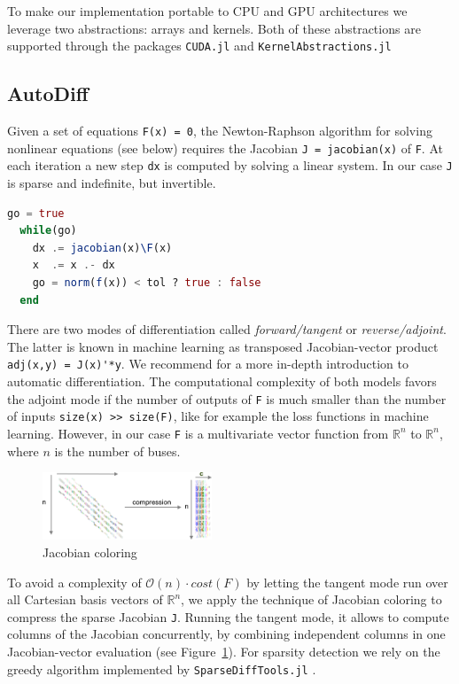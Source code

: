 \documentclass{juliacon}
\newcommand{\reffig}[1]{Figure~\ref{#1}}
\begin{document}
To make our implementation portable to CPU and GPU architectures we leverage
two abstractions: arrays and kernels. Both of these abstractions are
supported through the packages \lstinline{CUDA.jl} \cite{besard2018juliagpu,besard2019prototyping} and \lstinline{KernelAbstractions.jl}

\subsection{AutoDiff}

Given a set of equations \lstinline{F(x) = 0}, the Newton-Raphson algorithm for
solving nonlinear equations (see below) requires the Jacobian \lstinline{J = jacobian(x)}
of \lstinline{F}. At each iteration a new step \lstinline{dx} is computed by
solving a linear system. In our case \lstinline{J} is sparse and indefinite, but
invertible.

\begin{lstlisting}[language = Julia]
  go = true
  while(go)
    dx .= jacobian(x)\F(x)
    x  .= x .- dx
    go = norm(f(x)) < tol ? true : false
  end
\end{lstlisting}

There are two modes of differentiation called {\it forward/tangent} or
{\it reverse/adjoint}. The latter is known in machine learning as
transposed Jacobian-vector product \lstinline{adj(x,y) = J(x)'*y}. We recommend
\cite{griewank2008evaluating} for a more in-depth introduction to automatic
differentiation. The computational complexity of both models favors the
adjoint mode if the number of outputs of \lstinline{F} is much smaller than the
number of inputs \lstinline{size(x) >> size(F)}, like for example the loss functions
in machine learning. However, in our case \lstinline{F} is a multivariate vector
function from $\mathbb{R}^n$ to $\mathbb{R}^n$, where $n$ is the number of
buses.
\newcommand{\bigo}[1]{\mathcal{O}\left( #1 \right)}

\begin{figure}
    \centering
    \includegraphics[width=0.45\textwidth]{figures/compression.png}
    \caption{Jacobian coloring}
    \label{fig:coloring}
\end{figure}

To avoid a complexity of $\bigo{n} \cdot cost(F)$ by letting the tangent mode
run over all Cartesian basis vectors of $\mathbb{R}^n$, we apply the technique of Jacobian
coloring to compress the sparse Jacobian \lstinline{J}. Running the tangent mode, it
allows to compute columns of the Jacobian concurrently, by combining
independent columns in one Jacobian-vector evaluation (see
\reffig{fig:coloring}). For sparsity detection we rely on the greedy
algorithm implemented by \lstinline{SparseDiffTools.jl} \cite{sparsedifftools}.
\end{document}
